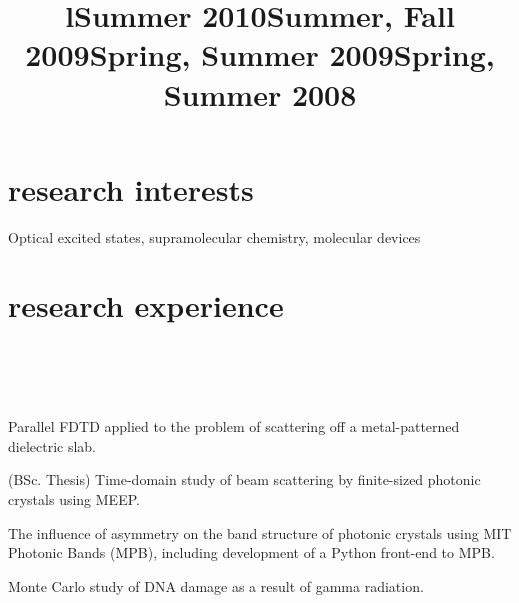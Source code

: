 \documentclass[overlapped,line,10pt,letterpaper]{res}
\begin{document}
\begin{resume}
\section{research interests}
Optical excited states, supramolecular chemistry, molecular devices

\section{research experience}

\begin{format}
\title{l}\\
\\
\body\\
\end{format}
\title{\bfseries Summer 2010}
\dates{}
\begin{position}
Parallel FDTD applied to the problem of scattering off a metal-patterned dielectric slab.
\end{position}
\title{\bfseries Summer, Fall 2009}
\dates{}
\begin{position}
(BSc. Thesis) Time-domain study of beam scattering by finite-sized photonic crystals using MEEP. 
\end{position}
\title{\bfseries Spring, Summer 2009}
\dates{}
\begin{position}
The influence of asymmetry on the band structure of photonic crystals using MIT Photonic Bands (MPB), including development of a Python front-end to MPB.
\end{position}
\title{\bfseries Spring, Summer 2008}
\dates{}
\begin{position}
Monte Carlo study of DNA damage as a result of gamma radiation.
\end{position}


\end{resume}
\end{document}
